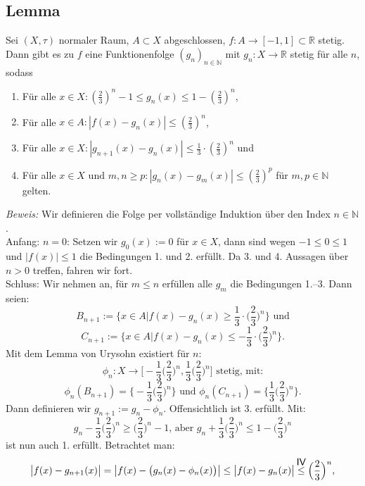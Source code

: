 \documentclass[11pt,leqno]{article}
\newcommand\myleq{\mathrel{\overset{\makebox[0pt]{\mbox{\normalfont\sffamily IV}}}{\leq}}}
\begin{document}
\subsection{Lemma}
Sei $(X, \tau)$ normaler Raum, $A \subset X$ abgeschlossen, $f: A \rightarrow [-1,1]\subset \mathbb{R}$ stetig.
Dann gibt es zu $f$ eine Funktionenfolge $(g_n)_{n \in \mathbb{N}}$ mit $g_n: X \rightarrow \mathbb{R}$ stetig für alle $n$, sodass
\begin{enumerate}
    \item Für alle $x \in X: (\frac{2}{3})^n -1 \leq g_n(x) \leq 1-(\frac{2}{3})^n$,
    \item Für alle $x \in A: |f(x)-g_n(x)| \leq (\frac{2}{3})^n$,
    \item Für alle $x \in X: |g_{n+1}(x) - g_n(x)| \leq \frac{1}{3} \cdot (\frac{2}{3})^n$ und
    \item Für alle $x \in X \text{ und } m,n \geq p: |g_n(x) - g_m(x)| \leq (\frac{2}{3})^p$ für $m,p \in \mathbb{N}$ gelten.
\end{enumerate}
\textit{Beweis:} Wir definieren die Folge per vollständige Induktion über den Index $n \in \mathbb{N}$. \\
Anfang: $n=0$: Setzen wir $g_0(x):=0$ für $x \in X$, dann sind wegen $-1 \leq 0 \leq 1$ und $|f(x)| \leq 1$ die Bedingungen 1. und 2.
erfüllt. Da 3. und 4. Aussagen über $n > 0$ treffen, fahren wir fort. \\
Schluss: Wir nehmen an, für $m \leq n$ erfüllen alle $g_m$ die Bedingungen 1.–3. Dann seien:
\[B_{n+1} := \biggl\{x \in A \Big\vert f(x)-g_n(x) \geq \frac{1}{3} \cdot \biggl(\frac{2}{3}\biggr)^n\biggr\} \text{ und}\]
\[C_{n+1} := \biggl\{x \in A \Big\vert f(x)-g_n(x) \leq -\frac{1}{3} \cdot \biggl(\frac{2}{3}\biggr)^n\biggr\}.\]
Mit dem Lemma von Urysohn existiert für $n$:
\[\phi_n:X \rightarrow \biggl[-\frac{1}{3}\biggl(\frac{2}{3}\biggr)^n, \frac{1}{3}\biggl(\frac{2}{3}\biggr)^n\biggr] \text{ stetig, mit:}\]
\[\phi_n(B_{n+1}) = \biggl\{-\frac{1}{3}\biggl(\frac{2}{3}\biggr)^n\biggr\} \text{ und } 
\phi_n(C_{n+1}) = \biggl\{\frac{1}{3}\biggl(\frac{2}{3}\biggr)^n\biggr\}.\]
Dann definieren wir $g_{n+1} := g_n - \phi_n$. Offensichtlich ist 3. erfüllt. Mit:
\[ g_n -\frac{1}{3}\biggl(\frac{2}{3}\biggr)^n \geq \biggl(\frac{2}{3}\biggr)^n -1 \text{, aber } g_n + \frac{1}{3}\biggl(\frac{2}{3}\biggr)^n \leq 
1- \biggl(\frac{2}{3}\biggr)^n\]
ist nun auch 1. erfüllt. Betrachtet man:
\[\big\vert f(x)-g_{n+1}(x)\big\vert =\big\vert f(x)-\big(g_n(x)-\phi_n(x)\big)\big\vert\leq\big\vert f(x)-g_n(x)\big\vert\myleq\Big(\frac{2}{3}\Big)^n,\]
\end{document}
